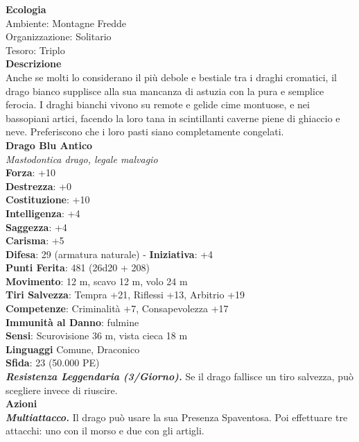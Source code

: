 \begin{multicols}{2}
\textbf{Ecologia}\\
Ambiente: Montagne Fredde\\
Organizzazione: Solitario\\
Tesoro: Triplo\\
\textbf{Descrizione}\\
Anche se molti lo considerano il più debole e bestiale tra i draghi cromatici, il drago bianco supplisce alla sua mancanza di astuzia con la pura e semplice ferocia. I draghi bianchi vivono su remote e gelide cime montuose, e nei bassopiani artici, facendo la loro tana in scintillanti caverne piene di ghiaccio e neve. Preferiscono che i loro pasti siano completamente congelati.\\


\medskip\textbf{Drago Blu Antico}\\
\emph{Mastodontica drago, legale malvagio}\\
\textbf{Forza}: +10\\
\textbf{Destrezza}: +0\\
\textbf{Costituzione}: +10\\
\textbf{Intelligenza}: +4\\
\textbf{Saggezza}: +4\\
\textbf{Carisma}: +5\\	
\textbf{Difesa}: 29 (armatura naturale) - \textbf{Iniziativa}: +4\\
\textbf{Punti Ferita}: 481 (26d20 + 208)\\
\textbf{Movimento}: 12 m, scavo 12 m, volo 24 m\\
\textbf{Tiri Salvezza}: Tempra +21, Riflessi +13, Arbitrio +19\\
\textbf{Competenze}: Criminalità +7, Consapevolezza +17\\
\textbf{Immunità al Danno}: fulmine\\
\textbf{Sensi}: Scurovisione 36 m, vista cieca 18 m\\
\textbf{Linguaggi} Comune, Draconico\\
\textbf{Sfida}: 23 (50.000 PE)\smallskip\\
\emph{\textbf{Resistenza Leggendaria (3/Giorno).}} Se il drago fallisce un tiro salvezza, può scegliere invece di riuscire. \\
\smallskip\textbf{Azioni}\\
\emph{\textbf{Multiattacco.}} Il drago può usare la sua Presenza Spaventosa. Poi effettuare tre attacchi: uno con il morso e due con gli artigli.\\

\end{multicols}
